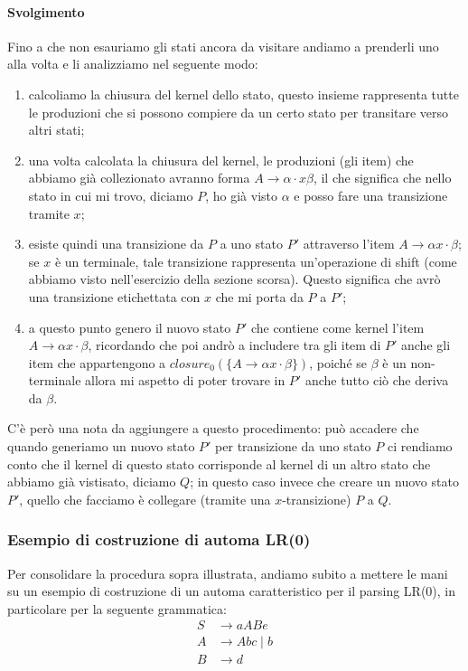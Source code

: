 \documentclass[class=book, crop=false, oneside, 12pt]{standalone}
\begin{document}
\paragraph{Svolgimento}
Fino a che non esauriamo gli stati ancora da visitare andiamo a prenderli uno alla volta e li analizziamo nel seguente modo:
\begin{enumerate}
    \item calcoliamo la chiusura del kernel dello stato, questo insieme rappresenta tutte le produzioni che si possono compiere da un certo stato per transitare verso altri stati;
    \item una volta calcolata la chiusura del kernel, le produzioni (gli item) che abbiamo già collezionato avranno forma \(A \to \alpha \cdot x \beta\), il che significa che nello stato in cui mi trovo, diciamo \(P\), ho già visto \(\alpha\) e posso fare una transizione tramite \(x\);
    \item esiste quindi una transizione da \(P\) a uno stato \(P'\) attraverso l'item \(A \to \alpha x \cdot \beta\); se \(x\) è un terminale, tale transizione rappresenta un'operazione di shift (come abbiamo visto nell'esercizio della sezione scorsa). Questo significa che avrò una transizione etichettata con \(x\) che mi porta da \(P\) a \(P'\);
    \item a questo punto genero il nuovo stato \(P'\) che contiene come kernel l'item \(A \to \alpha x \cdot \beta\), ricordando che poi andrò a includere tra gli item di \(P'\) anche gli item che appartengono a \(closure_0 (\{ A \to \alpha x \cdot \beta \})\), poiché se \(\beta\) è un non-terminale allora mi aspetto di poter trovare in \(P'\) anche tutto ciò che deriva da \(\beta\).
\end{enumerate}
C'è però una nota da aggiungere a questo procedimento: può accadere che quando generiamo un nuovo stato \(P'\) per transizione da uno stato \(P\) ci rendiamo conto che il kernel di questo stato corrisponde al kernel di un altro stato che abbiamo già vistisato, diciamo \(Q\); in questo caso invece che creare un nuovo stato \(P'\), quello che facciamo è collegare (tramite una \(x\)-transizione) \(P\) a \(Q\).

\subsubsection{Esempio di costruzione di automa LR(0)}
\label{subsubsec:esercizio_costruzione_automa_lr0}
Per consolidare la procedura sopra illustrata, andiamo subito a mettere le mani su un esempio di costruzione di un automa caratteristico per il parsing LR(0), in particolare per la seguente grammatica:
\begin{align*}
    S &\to aABe \\
    A &\to Abc \mid b \\
    B &\to d
\end{align*}
\end{document}
